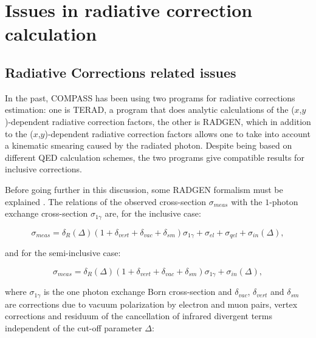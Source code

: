 
\chapter{Issues in radiative correction calculation} %

\label{ch:Issues} %


\section{Radiative Corrections related issues}

In the past, COMPASS has been using two programs for radiative corrections estimation: one is TERAD, a program that does analytic calculations of the ($x$,$y$)-dependent radiative correction factors, the other is RADGEN, which in addition to the ($x$,$y$)-dependent radiative correction factors allows one to take into account a kinematic smearing caused by the radiated photon. Despite being based on different QED calculation schemes, the two programs give compatible results for inclusive corrections.

Before going further in this discussion, some RADGEN formalism must be explained \cite{RADGEN}. The relations of the observed cross-section $\sigma_{meas}$ with the $1$-photon exchange cross-section $\sigma_{1\gamma}$ are, for the inclusive case:

\begin{equation}
    \sigma_{meas} = \delta_R(\Delta) (1+\delta_{vert}+\delta_{vac}+\delta_{sm})\sigma_{1\gamma}+\sigma_{el}+\sigma_{qel}+\sigma_{in}(\Delta),
\end{equation}

and for the semi-inclusive case:

\begin{equation}
    \sigma_{meas} = \delta_R(\Delta) (1+\delta_{vert}+\delta_{vac}+\delta_{sm})\sigma_{1\gamma}+\sigma_{in}(\Delta),
\end{equation}

where $\sigma_{1\gamma}$ is the one photon exchange Born cross-section and $\delta_{vac}$, $\delta_{vert}$ and $\delta_{sm}$ are corrections due to vacuum polarization by electron and muon pairs, vertex corrections and residuum of the cancellation of infrared divergent terms independent of the cut-off parameter $\Delta$:

